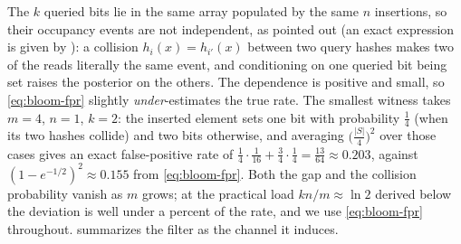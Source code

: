 \begin{remark}
\label{rem:bloom-independence}
The $k$ queried bits lie in the same array populated by the same $n$
insertions, so their occupancy events are not independent, as
\textcite{bose-et-al-2008} pointed out (an exact expression is given by
\textcite{christensen-roginsky-jimeno-2010}): a collision
$h_i(x) = h_{i'}(x)$ between two query hashes makes two of the reads
literally the same event, and conditioning on one queried bit being set
raises the posterior on the others. The dependence is positive and small,
so \eqref{eq:bloom-fpr} slightly \emph{under}-estimates the true rate. The
smallest witness takes $m = 4$, $n = 1$, $k = 2$: the inserted element sets
one bit with probability $\tfrac14$ (when its two hashes collide) and two
bits otherwise, and averaging $\bigl(\tfrac{|S|}{4}\bigr)^2$ over those
cases gives an exact false-positive rate of
$\tfrac14 \cdot \tfrac{1}{16} + \tfrac34 \cdot \tfrac14 = \tfrac{13}{64}
\approx 0.203$, against $(1 - e^{-1/2})^2 \approx 0.155$ from
\eqref{eq:bloom-fpr}. Both the gap and the collision probability vanish as
$m$ grows; at the practical load $kn/m \approx \ln 2$ derived below the
deviation is well under a percent of the rate, and we use
\eqref{eq:bloom-fpr} throughout.  summarizes the
filter as the channel it induces.
\end{remark}

